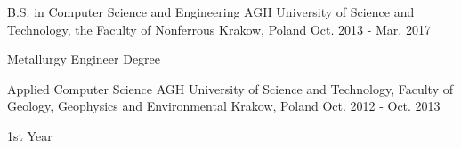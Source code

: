 

\begin{cventries}

  \cventry
    {B.S. in Computer Science and Engineering} %
    {AGH University of Science and Technology, the Faculty of Nonferrous} %
    {Krakow, Poland} %
    {Oct. 2013 - Mar. 2017} %
    {
      \begin{cvitems} %
        \item {Metallurgy Engineer Degree}
      \end{cvitems}
    }

\cventry
    {Applied Computer Science}%
    {AGH University of Science and Technology, Faculty of Geology, Geophysics and Environmental} %
    {Krakow, Poland} %
    {Oct. 2012 - Oct. 2013} %
    {
      \begin{cvitems} %
        \item { 1st Year }
      \end{cvitems}
    }
\end{cventries}

